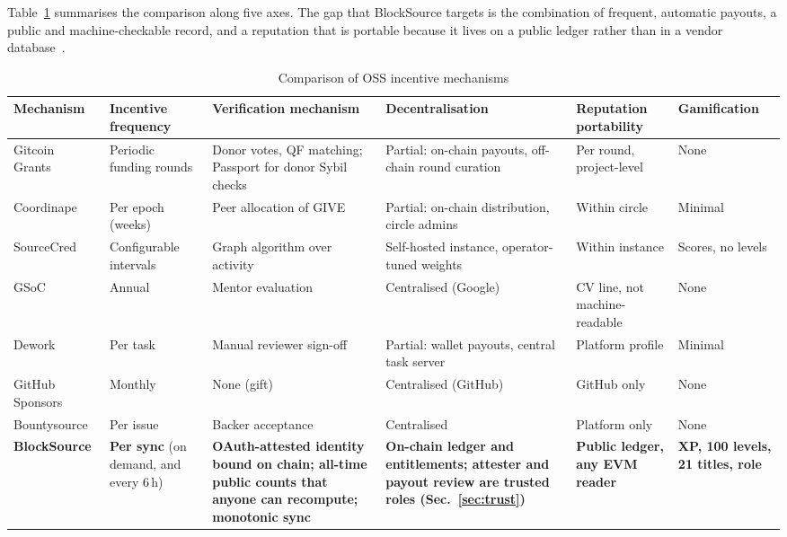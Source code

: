 \documentclass[conference]{IEEEtran}
\begin{document}
Table~\ref{tab:compare} summarises the comparison along five axes. The gap that BlockSource targets is the combination of frequent, automatic payouts, a public and machine-checkable record, and a reputation that is portable because it lives on a public ledger rather than in a vendor database~\cite{weyl2022soul}.

\begin{table}[!t]
\centering
\caption{Comparison of OSS incentive mechanisms}
\label{tab:compare}
\footnotesize
\setlength{\tabcolsep}{4pt}
\begin{tabular}{@{}>{\raggedright\arraybackslash}p{2.3cm}>{\raggedright\arraybackslash}p{2.3cm}>{\raggedright\arraybackslash}p{3.7cm}>{\raggedright\arraybackslash}p{3.3cm}>{\raggedright\arraybackslash}p{2.5cm}>{\raggedright\arraybackslash}p{2.2cm}@{}}
\toprule
\textbf{Mechanism} & \textbf{Incentive frequency} & \textbf{Verification mechanism} & \textbf{Decentralisation} & \textbf{Reputation portability} & \textbf{Gamification} \\
\midrule
Gitcoin Grants~\cite{gitcoin,buterin2019qf} & Periodic funding rounds & Donor votes, QF matching; Passport for donor Sybil checks & Partial: on-chain payouts, off-chain round curation & Per round, project-level & None \\
Coordinape~\cite{coordinape} & Per epoch (weeks) & Peer allocation of GIVE & Partial: on-chain distribution, circle admins & Within circle & Minimal \\
SourceCred~\cite{sourcecred} & Configurable intervals & Graph algorithm over activity & Self-hosted instance, operator-tuned weights & Within instance & Scores, no levels \\
GSoC~\cite{silva2020gsoc} & Annual & Mentor evaluation & Centralised (Google) & CV line, not machine-readable & None \\
Dework~\cite{dework} & Per task & Manual reviewer sign-off & Partial: wallet payouts, central task server & Platform profile & Minimal \\
GitHub Sponsors~\cite{shimada2022sponsors} & Monthly & None (gift) & Centralised (GitHub) & GitHub only & None \\
Bountysource~\cite{zhou2021bounty} & Per issue & Backer acceptance & Centralised & Platform only & None \\
\midrule
\textbf{BlockSource} & \textbf{Per sync} (on demand, and every 6\,h) & \textbf{OAuth-attested identity bound on chain; all-time public counts that anyone can recompute; monotonic sync} & \textbf{On-chain ledger and entitlements; attester and payout review are trusted roles (Sec.~\ref{sec:trust})} & \textbf{Public ledger, any EVM reader} & \textbf{XP, 100 levels, 21 titles, role} \\
\bottomrule
\end{tabular}
\end{table}
\end{document}
